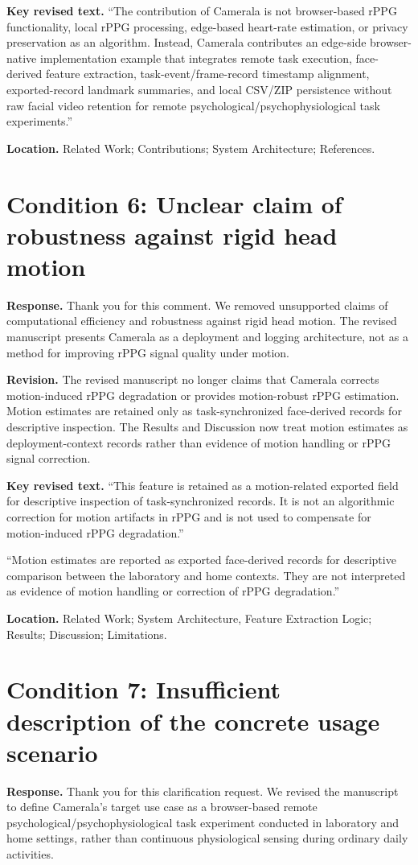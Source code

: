 \documentclass[11pt]{article}
\newcommand{\condition}[2]{\section*{Condition #1: #2}}
\begin{document}
\textbf{Key revised text.}
``The contribution of Camerala is not browser-based rPPG functionality, local rPPG processing, edge-based heart-rate estimation, or privacy preservation as an algorithm. Instead, Camerala contributes an edge-side browser-native implementation example that integrates remote task execution, face-derived feature extraction, task-event/frame-record timestamp alignment, exported-record landmark summaries, and local CSV/ZIP persistence without raw facial video retention for remote psychological/psychophysiological task experiments.''

\textbf{Location.}
Related Work; Contributions; System Architecture; References.

\condition{6}{Unclear claim of robustness against rigid head motion}
\textbf{Response.}
Thank you for this comment.
We removed unsupported claims of computational efficiency and robustness against rigid head motion.
The revised manuscript presents Camerala as a deployment and logging architecture, not as a method for improving rPPG signal quality under motion.

\textbf{Revision.}
The revised manuscript no longer claims that Camerala corrects motion-induced rPPG degradation or provides motion-robust rPPG estimation.
Motion estimates are retained only as task-synchronized face-derived records for descriptive inspection.
The Results and Discussion now treat motion estimates as deployment-context records rather than evidence of motion handling or rPPG signal correction.

\textbf{Key revised text.}
``This feature is retained as a motion-related exported field for descriptive inspection of task-synchronized records. It is not an algorithmic correction for motion artifacts in rPPG and is not used to compensate for motion-induced rPPG degradation.''

``Motion estimates are reported as exported face-derived records for descriptive comparison between the laboratory and home contexts. They are not interpreted as evidence of motion handling or correction of rPPG degradation.''

\textbf{Location.}
Related Work; System Architecture, Feature Extraction Logic; Results; Discussion; Limitations.

\condition{7}{Insufficient description of the concrete usage scenario}
\textbf{Response.}
Thank you for this clarification request.
We revised the manuscript to define Camerala's target use case as a browser-based remote psychological/psychophysiological task experiment conducted in laboratory and home settings, rather than continuous physiological sensing during ordinary daily activities.
\end{document}
